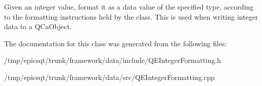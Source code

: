 \label{classQEIntegerFormatting_adba4f788d19732bd676508b25e3a4132}
Given an integer value, format it as a data value of the specified type, according to the formatting instructions held by the class. This is used when writing integer data to a QCaObject. 

The documentation for this class was generated from the following files:\begin{DoxyCompactItemize}
\item 
/tmp/epicsqt/trunk/framework/data/include/QEIntegerFormatting.h\item 
/tmp/epicsqt/trunk/framework/data/src/QEIntegerFormatting.cpp\end{DoxyCompactItemize}
